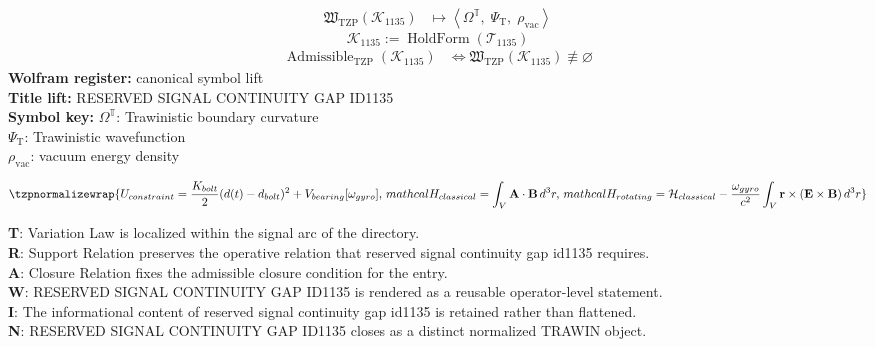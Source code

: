 \noindent
\begin{minipage}[t]{0.48\linewidth}
\begingroup
\small
\[
\begin{aligned}
\mathfrak{W}_{\mathrm{TZP}}\!\left(\mathcal{K}_{1135}\right)
&\longmapsto
\left\langle \Omega^{\mathbb{T}},\; \Psi_{\mathrm{T}},\; \rho_{\mathrm{vac}} \right\rangle
\end{aligned}
\]
\[
\mathcal{K}_{1135}
:=
\operatorname{HoldForm}\!\left(\mathcal{T}_{1135}\right)
\]
\[
\begin{aligned}
\operatorname{Admissible}_{\mathrm{TZP}}\!\left(\mathcal{K}_{1135}\right)
&\Longleftrightarrow
\mathfrak{W}_{\mathrm{TZP}}\!\left(\mathcal{K}_{1135}\right)\not\equiv\varnothing
\end{aligned}
\]
\textbf{Wolfram register:} canonical symbol lift\\
\textbf{Title lift:} RESERVED SIGNAL CONTINUITY GAP ID1135\\
\textbf{Symbol key:} \(\Omega^{\mathbb{T}}\): Trawinistic boundary curvature\\ \(\Psi_{\mathrm{T}}\): Trawinistic wavefunction\\ \(\rho_{\mathrm{vac}}\): vacuum energy density
\par
\endgroup
\end{minipage}\hfill
\begin{minipage}[t]{0.48\linewidth}
\[
\tzpnormalizewrap{U_{constraint} = \frac{K_{bolt}}{2}(d(t)-d_{bolt})^{2} + V_{bearing}[\omega_{gyro}],\,mathcal{H}_{classical} = \int_V \mathbf{A} \cdot \mathbf{B} \, d^3r,\,mathcal{H}_{rotating} = \mathcal{H}_{classical} - \frac{\omega_{gyro}}{c^2}\int_V \mathbf{r} \times (\mathbf{E} \times \mathbf{B}) \, d^3r}
\]

\small
\textbf{T}: Variation Law is localized within the signal arc of the directory.\\
\textbf{R}: Support Relation preserves the operative relation that reserved signal continuity gap id1135 requires.\\
\textbf{A}: Closure Relation fixes the admissible closure condition for the entry.\\
\textbf{W}: RESERVED SIGNAL CONTINUITY GAP ID1135 is rendered as a reusable operator-level statement.\\
\textbf{I}: The informational content of reserved signal continuity gap id1135 is retained rather than flattened.\\
\textbf{N}: RESERVED SIGNAL CONTINUITY GAP ID1135 closes as a distinct normalized TRAWIN object.
\normalsize
\end{minipage}

